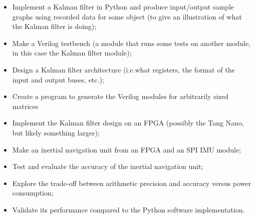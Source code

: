 \documentclass[12pt]{article}
\begin{document}
\begin{itemize}[noitemsep]
	\item Implement a Kalman filter in Python and produce input/output sample graphs using recorded data for some object (to give an illustration of what the Kalman filter is doing);
	\item Make a Verilog testbench (a module that runs some tests on another module, in this case the Kalman filter module);
	\item Design a Kalman filter architecture (i.e.\@ what registers, the format of the input and output buses, etc.);
	\item Create a program to generate the Verilog modules for arbitrarily sized matrices
	\item Implement the Kalman filter design on an FPGA (possibly the Tang Nano, but likely something larger);
	\item Make an inertial navigation unit from an FPGA and an SPI IMU module;
	\item Test and evaluate the accuracy of the inertial navigation unit;
	\item Explore the trade-off between arithmetic precision and accuracy versus power consumption;
	\item Validate its performance compared to the Python software implementation.
\end{itemize}
\end{document}
